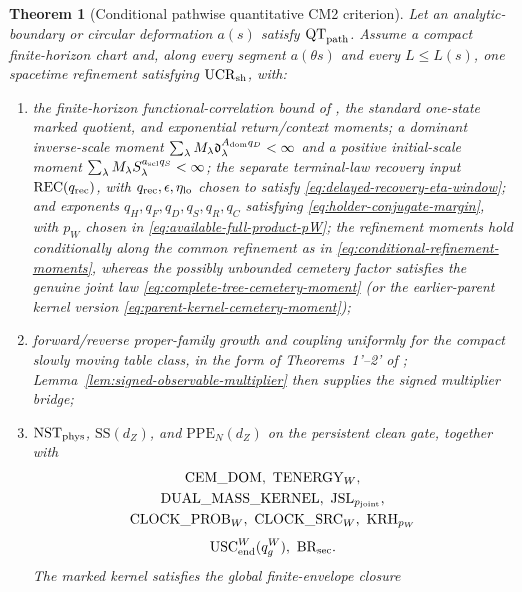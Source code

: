 \documentclass[11pt]{article}
\newtheorem{theorem}{Theorem}[section]
\begin{document}
\begin{theorem}[Conditional pathwise quantitative CM2 criterion]
\label{thm:global-cm2-assembly}
Let an analytic-boundary or circular deformation $a(s)$ satisfy
$\mathrm{QT}_{\rm path}$.
Assume a compact finite-horizon chart and, along every segment
$a(\theta s)$ and every $L\le L(s)$, one spacetime refinement satisfying
$\mathrm{UCR}_{\rm sh}$, with:
\begin{enumerate}[label=\textup{(H\arabic*)}]
\item the finite-horizon functional-correlation bound of \cite{LS}, the
      standard one-state marked quotient, and exponential return/context
      moments; a dominant inverse-scale moment
      $\sum_\lambda M_\lambda
      \mathfrak d_\lambda^{A_{\rm dom}q_D}<\infty$ and a positive initial-scale
      moment $\sum_\lambda M_\lambda
      S_\lambda^{a_{\rm scl}q_S}<\infty$; the separate terminal-law
      recovery input $\mathrm{REC}(q_{\rm rec})$, with
      $q_{\rm rec},\epsilon,\eta_{\rm lo}$ chosen to satisfy
      \eqref{eq:delayed-recovery-eta-window}; and
      exponents $q_H,q_F,q_D,q_S,q_R,q_C$ satisfying
      \eqref{eq:holder-conjugate-margin}, with $p_W$ chosen in
      \eqref{eq:available-full-product-pW}; the refinement moments hold
      conditionally along the common refinement as in
      \eqref{eq:conditional-refinement-moments}, whereas the possibly
      unbounded cemetery factor satisfies the genuine joint law
      \eqref{eq:complete-tree-cemetery-moment} (or the earlier-parent kernel
      version \eqref{eq:parent-kernel-cemetery-moment});
\item forward/reverse proper-family growth and coupling uniformly for the
      compact slowly moving table class, in the form of Theorems~1'--2' of
      \cite{SYZ}; Lemma~\ref{lem:signed-observable-multiplier} then supplies
      the signed multiplier bridge;
\item $\mathrm{NST}_{\rm phys}$, $\mathrm{SS}(d_Z)$, and
      $\mathrm{PPE}_{N}(d_Z)$ on the persistent clean gate, together with
      \[
       \begin{gathered}
       \mathrm{CEM\_DOM},\ \mathrm{TENERGY}_{W},\\
       \mathrm{DUAL\_MASS\_KERNEL},\ \mathrm{JSL}_{p_{\rm joint}},\\
       \mathrm{CLOCK\_PROB}_{W},\ \mathrm{CLOCK\_SRC}_{W},\
       \mathrm{KRH}_{p_W}
       \end{gathered}
      \]
      \[
       \mathrm{USC}_{\rm end}^{W}(q_g^W),\ \mathrm{BR}_{\rm sec}.
      \]
      The marked kernel satisfies the global finite-envelope closure

\end{enumerate}
\end{theorem}
\end{document}
